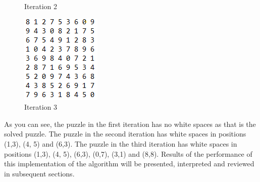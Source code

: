 \documentclass{article}
\begin{document}
\begin{figure}[!htb]
  \caption{Iteration 2}\label{fig:awesome_image2}
\endminipage\hfill
{}%
  \includegraphics[width=\linewidth]{iteration3.png}
  \caption{Iteration 3}\label{fig:awesome_image3}
\endminipage
\end{figure}


As you can see, the puzzle in the first iteration has no white spaces as that is the solved puzzle. The puzzle in the second iteration has white spaces in positions (1,3), (4, 5) and (6,3). The puzzle in the third iteration has white spaces in positions (1,3), (4, 5), (6,3), (0,7), (3,1) and (8,8). Results of the performance of this implementation of the algorithm will be presented, interpreted and reviewed in subsequent sections.

    
    \pagebreak 
\end{document}
